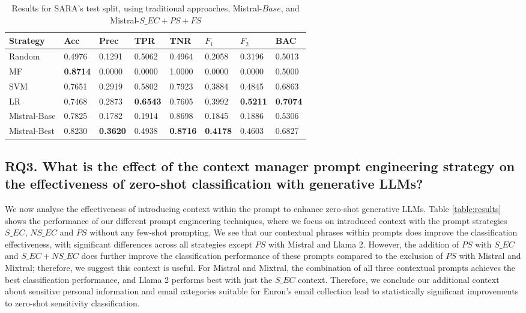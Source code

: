 \begin{table}[]
\small
\caption{Results for SARA's test split, using traditional approaches, Mistral-$Base$, and Mistral-$S\_EC+PS+FS$}
\label{table:ml}
\begin{tabular}{@{}p{0.45in}p{0.26in}p{0.26in}p{0.26in}p{0.26in}p{0.26in}p{0.26in}p{0.26in}@{}}
\toprule
Strategy      & Acc             & Prec            & TPR             & TNR             & $F_{1}$         & $F_{2}$         & BAC             \\ \midrule
Random        & 0.4976          & 0.1291          & 0.5062          & 0.4964          & 0.2058          & 0.3196          & 0.5013          \\
MF & \textbf{0.8714} & 0.0000          & 0.0000          & 1.0000          & 0.0000          & 0.0000          & 0.5000          \\
SVM           & 0.7651          & 0.2919          & 0.5802          & 0.7923          & 0.3884          & 0.4845          & 0.6863          \\
LR            & 0.7468          & 0.2873          & \textbf{0.6543} & 0.7605          & 0.3992          & \textbf{0.5211} & \textbf{0.7074} \\
Mistral-Base  & 0.7825          & 0.1782          & 0.1914          & 0.8698          & 0.1845          & 0.1886          & 0.5306          \\
Mistral-Best  & 0.8230          & \textbf{0.3620} & 0.4938          & \textbf{0.8716} & \textbf{0.4178} & 0.4603          & 0.6827          \\ \bottomrule
\end{tabular}
\end{table}


\subsection{RQ3. What is the effect of the context manager prompt engineering strategy on the effectiveness of zero-shot classification with generative LLMs?}
We now analyse the effectiveness of introducing context within the prompt to enhance zero-shot generative LLMs. Table \ref{table:results} shows the performance of our different prompt engineering techniques, where we focus on introduced context with the prompt strategies $S\_EC$, $NS\_EC$ and $PS$ without any few-shot prompting. We see that our contextual phrases within prompts does improve the classification effectiveness, with significant differences across all strategies except $PS$ with Mistral and Llama 2. However, the addition of $PS$ with $S\_EC$ and $S\_EC+NS\_EC$ does further improve the classification performance of these prompts compared to the exclusion of $PS$ with Mistral and Mixtral; therefore, we suggest this context is useful. For Mistral and Mixtral, the combination of all three contextual prompts achieves the best classification performance, and Llama 2 performs best with just the $S\_EC$ context. Therefore, we conclude our additional context about sensitive personal information and email categories suitable for Enron's email collection lead to statistically significant improvements to zero-shot sensitivity classification. 


